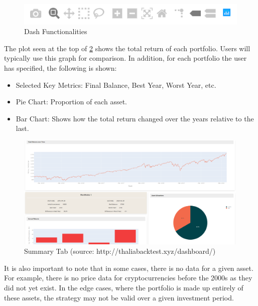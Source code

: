 \documentclass[main.tex]{subfiles}
\begin{document}
\begin{figure}[H]
   \centering
   \includegraphics[width=\textwidth]{08Appendices/081User/081Pictures/dash_funcionalities.png}
   \caption{Dash Functionalities}
   \label{dash_functionalities}
\end{figure}

The plot seen at the top of \figurename{\ref{summary}} shows the total return of each portfolio. Users will typically use this graph for comparison. In addition, for each portfolio the user has specified, the following is shown:

\begin{itemize}
    \item Selected Key Metrics: Final Balance, Best Year, Worst Year, etc.
    \item Pie Chart: Proportion of each asset.
    \item Bar Chart: Shows how the total return changed over the years relative to the last.
\end{itemize}

\begin{figure}[H]
   \centering
   \includegraphics[width=\textwidth]{08Appendices/081User/081Pictures/summary.png}
   \caption{Summary Tab (source: http://thaliabacktest.xyz/dashboard/)}
   \label{summary}
\end{figure}

It is also important to note that in some cases, there is no data for a given asset. For example, there is no price data for cryptocurrencies before the 2000s as they did not yet exist. In the edge cases, where the portfolio is made up entirely of these assets, the strategy may not be valid over a given investment period. 
\end{document}

